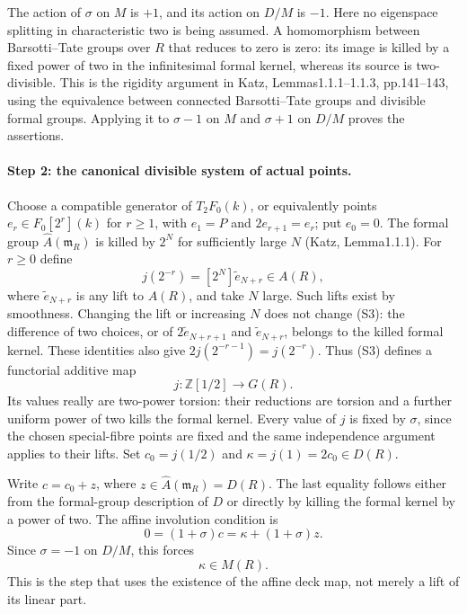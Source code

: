 The action of $\sigma$ on $M$ is $+1$, and its action on $D/M$ is
$-1$. Here no eigenspace splitting in characteristic two is being
assumed. A homomorphism between Barsotti--Tate groups over $R$ that
reduces to zero is zero: its image is killed by a fixed power of two
in the infinitesimal formal kernel, whereas its source is two-divisible.
This is the rigidity argument in Katz, Lemmas1.1.1--1.1.3,
pp.141--143, using the equivalence between connected Barsotti--Tate
groups and divisible formal groups. Applying it to $\sigma-1$ on
$M$ and $\sigma+1$ on $D/M$ proves the assertions.

\paragraph{Step 2: the canonical divisible system of actual points.}
Choose a compatible generator of $T_2F_0(k)$, or equivalently points
$e_r\in F_0[2^r](k)$ for $r\geq1$, with $e_1=P$ and
$2e_{r+1}=e_r$; put $e_0=0$. The formal group
$\widehat A(\mathfrak m_R)$ is killed by $2^N$ for sufficiently large
$N$ (Katz, Lemma1.1.1). For $r\geq0$ define
\[
 j(2^{-r})=[2^N]\widetilde e_{N+r}\in A(R),             \tag{S3}
\]
where $\widetilde e_{N+r}$ is any lift to $A(R)$, and take $N$ large.
Such lifts exist by smoothness. Changing the lift or increasing $N$
does not change (S3): the difference of two choices, or of
$2\widetilde e_{N+r+1}$ and $\widetilde e_{N+r}$, belongs to the
killed formal kernel. These identities also give
$2j(2^{-r-1})=j(2^{-r})$. Thus (S3) defines a functorial additive map
\[
 j:\mathbb Z[1/2]\longrightarrow G(R).
\]
Its values really are two-power torsion: their reductions are torsion
and a further uniform power of two kills the formal kernel. Every
value of $j$ is fixed by $\sigma$, since the chosen special-fibre
points are fixed and the same independence argument applies to their
lifts. Set $c_0=j(1/2)$ and $\kappa=j(1)=2c_0\in D(R)$.

Write $c=c_0+z$, where $z\in\widehat A(\mathfrak m_R)=D(R)$.
The last equality follows either from the formal-group description
of $D$ or directly by killing the formal kernel by a power of two.
The affine involution condition is
\[
 0=(1+\sigma)c=\kappa+(1+\sigma)z.
\]
Since $\sigma=-1$ on $D/M$, this forces
\[
                         \kappa\in M(R).                \tag{S4}
\]
This is the step that uses the existence of the affine deck map, not
merely a lift of its linear part.

